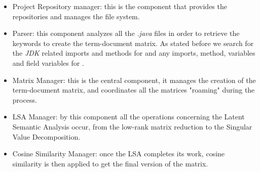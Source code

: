 \begin{itemize}
	\item Project Repository manager: this is the component that provides the repositories and manages the file system.
	\item Parser: this component analyzes all the \emph{.java} files in order to retrieve the keywords to create the term-document matrix. As stated before we search for the \emph{JDK} related imports and methods for \CLAN and any imports, method, variables and field variables for \MUDABlue.
	\item Matrix Manager: this is the central component, it manages the creation of the term-document matrix, and coordinates all the matrices "roaming" during the process. %
	\item LSA Manager: by this component all the operations concerning the Latent Semantic Analysis occur, from the low-rank matrix reduction to the Singular Value Decomposition.
	\item Cosine Similarity Manager: once the LSA completes its work, cosine similarity is then applied to get the final version of the matrix.
\end{itemize}


